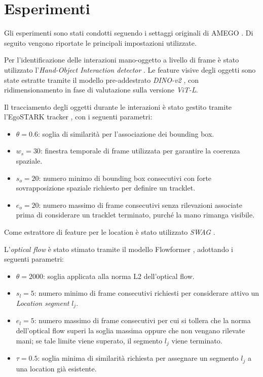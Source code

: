 \chapter{Esperimenti}
\label{cap:Esperimenti}
Gli esperimenti sono stati condotti seguendo i settaggi originali di AMEGO \cite{goletto2024amego}.  
Di seguito vengono riportate le principali impostazioni utilizzate.

Per l'identificazione delle interazioni mano-oggetto a livello di frame è stato utilizzato l'\emph{Hand-Object Interaction detector} \cite{shan2020understandinghumanhandscontact}.  
Le feature visive degli oggetti sono state estratte tramite il modello pre-addestrato \emph{DINO-v2} \cite{oquab2024dinov2learningrobustvisual}, con ridimensionamento in fase di valutazione sulla versione \emph{ViT-L}.  

Il tracciamento degli oggetti durante le interazioni è stato gestito tramite l'EgoSTARK tracker \cite{tang2023egotrackslongtermegocentricvisual}, con i seguenti parametri:

\begin{itemize}
    \item $\theta = 0.6$: soglia di similarità per l'associazione dei bounding box.
    \item $w_s = 30$: finestra temporale di frame utilizzata per garantire la coerenza spaziale.
    \item $s_o = 20$: numero minimo di bounding box consecutivi con forte sovrapposizione spaziale richiesto per definire un tracklet.
    \item $e_o = 20$: numero massimo di frame consecutivi senza rilevazioni associate prima di considerare un tracklet terminato, purché la mano rimanga visibile.
\end{itemize}

Come estrattore di feature per le location è stato utilizzato \emph{SWAG} \cite{singh2022revisitingweaklysupervisedpretraining}.

L'\emph{optical flow} è stato stimato tramite il modello Flowformer \cite{huang2022flowformertransformerarchitectureoptical}, adottando i seguenti parametri:

\begin{itemize}
    \item $\theta = 2000$: soglia applicata alla norma L2 dell'optical flow.
    \item $s_l = 5$: numero minimo di frame consecutivi richiesti per considerare attivo un \emph{Location segment} $l_j$.
    \item $e_l = 5$: numero massimo di frame consecutivi per cui si tollera che 
    la norma dell'optical flow superi la soglia massima oppure che non vengano 
    rilevate mani; se tale limite viene superato, il segmento $l_j$ viene terminato.
    \item $\tau = 0.5$: soglia minima di similarità richiesta per assegnare un segmento $l_j$ a una location già esistente.
\end{itemize}

